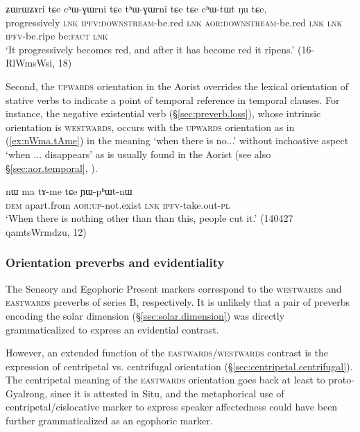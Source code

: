 \begin{exe}
\ex \label{ex:chWGWrni}
\gll ʑɯrɯʑɤri tɕe cʰɯ-ɣɯrni tɕe tʰɯ-ɣɯrni tɕe tɕe cʰɯ-tɯt ŋu tɕe,  \\
progressively \textsc{lnk} \textsc{ipfv}:\textsc{downstream}-be.red \textsc{lnk} \textsc{aor}:\textsc{downstream}-be.red \textsc{lnk} \textsc{lnk} \textsc{ipfv}-be.ripe be:\textsc{fact} \textsc{lnk}  \\
\glt `It progressively becomes red, and after it has become red it ripens.' (16-RlWmsWsi, 18)
\end{exe}

Second, the \textsc{upwards} orientation in the Aorist overrides the lexical orientation of stative verbs to indicate a point of temporal reference in temporal clauses. For instance, the negative existential verb  (§\ref{sec:preverb.loss}), whose intrinsic orientation is \textsc{westwards}, occurs with the \textsc{upwards} orientation as in (\ref{ex:nWma.tAme}) in the meaning `when there is no...' without inchoative aspect `when ... disappears' as is usually found in the Aorist (see also §\ref{sec:aor.temporal}, \citealt[283, fn 10]{jacques14linking}).

\begin{exe}
\ex \label{ex:nWma.tAme}
\gll  nɯ ma tɤ-me tɕe ɲɯ-pʰɯt-nɯ  \\
\textsc{dem} apart.from \textsc{aor}:\textsc{up}-not.exist \textsc{lnk}  \textsc{ipfv}-take.out-\textsc{pl}   \\
\glt `When there is nothing other than than this, people cut it.' (140427 qamtsWrmdzu, 12)
\end{exe} 

\subsubsection{Orientation preverbs and evidentiality} \label{sec:orientation.preverb.evd}
The Sensory  and Egophoric Present  markers correspond to the \textsc{westwards} and \textsc{eastwards} preverbs of series B, respectively. It is unlikely that a pair of preverbs encoding the solar dimension (§\ref{sec:solar.dimension}) was directly grammaticalized to express an evidential contrast.

However, an extended function of the \textsc{eastwards}/\textsc{westwards} contrast is the expression of centripetal vs. centrifugal orientation (§\ref{sec:centripetal.centrifugal}). The centripetal meaning of the \textsc{eastwards} orientation goes back at least to proto-Gyalrong, since it is attested in Situ, and the metaphorical use of centripetal/cislocative marker to express speaker affectedness could have been further grammaticalized as an egophoric marker. 

